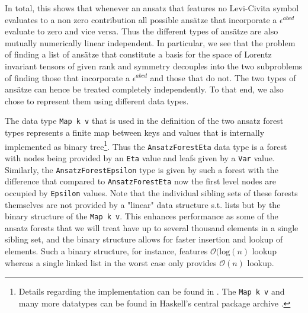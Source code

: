 \documentclass[a4paper,12pt, DIV=14, BCOR=5mm, twoside, headsepline, numbers=noenddot]{scrbook}
\begin{document}
In total, this shows that whenever an ansatz that features no Levi-Civita symbol evaluates to a non zero contribution all possible ansätze that incorporate a $\epsilon^{abcd}$ evaluate to zero and vice versa. Thus the different types of ansätze are also mutually numerically linear independent. In particular, we see that the problem of finding a list of ansätze that constitute a basis for the space of Lorentz invariant tensors of given rank and symmetry decouples into the two subproblems of finding those that incorporate a $\epsilon^{abcd}$ and those that do not. The two types of ansätze can hence be treated completely independently. To that end, we also chose to represent them using different data types. 

The data type \texttt{Map k v} that is used in the definition of the two ansatz forest types represents a finite map between keys and values that is internally implemented as binary tree\footnote{Details regarding the implementation can be found in \cite{adams_1993}. The \texttt{Map k v} \cite{HackageMap} and many more datatypes can be found in Haskell's central package archive \cite{Hackage}.}. Thus the \texttt{AnsatzForestEta} data type is a forest with nodes being provided by an \texttt{Eta} value and leafs given by a \texttt{Var} value. Similarly, the \texttt{AnsatzForestEpsilon} type is given by such a forest with the difference that compared to \texttt{AnsatzForestEta} now the first level nodes are occupied by \texttt{Epsilon} values. Note that the individual sibling sets of these forests themselves are not provided by a "linear" data structure s.t. lists but by the binary structure of the \texttt{Map k v}. This enhances performance as some of the ansatz forests that we will treat have up to several thousand elements in a single sibling set, and the binary structure allows for faster insertion and lookup of elements. Such a binary structure, for instance, features $\mathcal{O}(\mathrm{log}(n)$ lookup whereas a single linked list in the worst case only provides $\mathcal{O}(n)$ lookup. 
\end{document}
